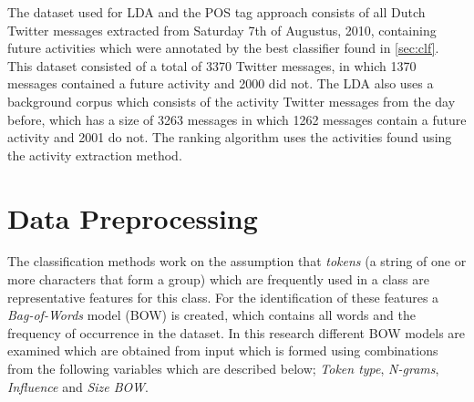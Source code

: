 The dataset used for LDA and the POS tag approach consists of all Dutch Twitter messages extracted from Saturday 7th of Augustus, 2010, containing future activities which were annotated by the best classifier found in \autoref{sec:clf}. This dataset consisted of a total of 3370 Twitter messages, in which 1370 messages contained a future activity and 2000 did not. The LDA also uses a background corpus which consists of the activity Twitter messages from the day before, which has a size of 3263 messages in which 1262 messages contain a future activity and 2001 do not. The ranking algorithm uses the activities found using the activity extraction method.

\section{Data Preprocessing}\label{sec:prep}
The classification methods work on the assumption that \textit{tokens}  (a string of one or more characters that form a group) which are frequently used in a class are representative features for this class. For the identification of these features a \textit{Bag-of-Words} model (BOW) is created, which contains all words and the frequency of occurrence in the dataset. In this research different BOW models are examined which are obtained from input which is formed using combinations from the following variables which are described below; \textit{Token type}, \textit{N-grams}, \textit{Influence} and \textit{Size BOW}.

